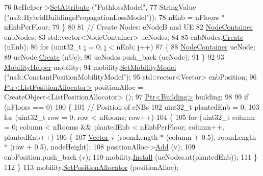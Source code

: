 \begin{DoxyCode}
76       lteHelper->\hyperlink{classns3_1_1ObjectBase_ac60245d3ea4123bbc9b1d391f1f6592f}{SetAttribute} (\textcolor{stringliteral}{"PathlossModel"},
77                                StringValue (\textcolor{stringliteral}{"ns3::HybridBuildingsPropagationLossModel"}));
78       nEnb = nFloors * nEnbPerFloor;
79     \}
80 
81   \textcolor{comment}{// Create Nodes: eNodeB and UE}
82   \hyperlink{classns3_1_1NodeContainer}{NodeContainer} enbNodes;
83   std::vector<NodeContainer> ueNodes;
84 
85   enbNodes.\hyperlink{classns3_1_1NodeContainer_a787f059e2813e8b951cc6914d11dfe69}{Create} (nEnb);
86   \textcolor{keywordflow}{for} (uint32\_t \hyperlink{bernuolliDistribution_8m_a6f6ccfcf58b31cb6412107d9d5281426}{i} = 0; \hyperlink{bernuolliDistribution_8m_a6f6ccfcf58b31cb6412107d9d5281426}{i} < nEnb; \hyperlink{bernuolliDistribution_8m_a6f6ccfcf58b31cb6412107d9d5281426}{i}++)
87     \{
88       \hyperlink{classns3_1_1NodeContainer}{NodeContainer} ueNode;
89       ueNode.\hyperlink{classns3_1_1NodeContainer_a787f059e2813e8b951cc6914d11dfe69}{Create} (nUe);
90       ueNodes.push\_back (ueNode);
91     \}
92 
93   \hyperlink{classns3_1_1MobilityHelper}{MobilityHelper} mobility;
94   mobility.\hyperlink{classns3_1_1MobilityHelper_a030275011b6f40682e70534d30280aba}{SetMobilityModel} (\textcolor{stringliteral}{"ns3::ConstantPositionMobilityModel"});
95   std::vector<Vector> enbPosition;
96   \hyperlink{classns3_1_1Ptr}{Ptr<ListPositionAllocator>} positionAlloc = CreateObject<ListPositionAllocator> 
      ();
97   \hyperlink{classns3_1_1Ptr}{Ptr<Building>} building;
98 
99   \textcolor{keywordflow}{if} (nFloors == 0)
100     \{
101       \textcolor{comment}{// Position of eNBs}
102       uint32\_t plantedEnb = 0;
103       \textcolor{keywordflow}{for} (uint32\_t row = 0; row < nRooms; row++)
104         \{
105           \textcolor{keywordflow}{for} (uint32\_t column = 0; column < nRooms && plantedEnb < nEnbPerFloor; column++, plantedEnb++)
106             \{
107               \hyperlink{classns3_1_1Vector3D_a7e59b47bc94c9cb1dadff68c1d0112d8}{Vector} v (roomLength * (column + 0.5), roomLength * (row + 0.5), nodeHeight);
108               positionAlloc->\hyperlink{classns3_1_1ListPositionAllocator_a460e82f015ac012a73ba0ea0cccb3486}{Add} (v);
109               enbPosition.push\_back (v);
110               mobility.\hyperlink{classns3_1_1MobilityHelper_a07737960ee95c0777109cf2994dd97ae}{Install} (ueNodes.at(plantedEnb));
111             \}
112         \}
113       mobility.\hyperlink{classns3_1_1MobilityHelper_ac59d5295076be3cc11021566713a28c5}{SetPositionAllocator} (positionAlloc);

\end{DoxyCode}
